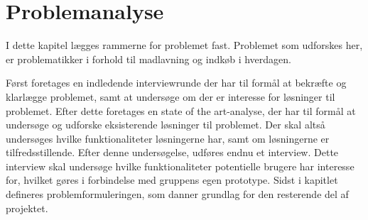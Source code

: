 \chapter{Problemanalyse}\label{chapter:problemanalyse}
I dette kapitel lægges rammerne for problemet fast.
Problemet som udforskes her, er problematikker i forhold til madlavning og indkøb i hverdagen. 

Først foretages en indledende interviewrunde der har til formål at bekræfte og klarlægge problemet, samt at undersøge om der er interesse for løsninger til problemet.
Efter dette foretages en state of the art-analyse, der har til formål at undersøge og udforske eksisterende løsninger til problemet.
Der skal altså undersøges hvilke funktionaliteter løsningerne har, samt om løsningerne er tilfredsstillende.
Efter denne undersøgelse, udføres endnu et interview.
Dette interview skal undersøge hvilke funktionaliteter potentielle brugere har interesse for, hvilket gøres i forbindelse med gruppens egen prototype.
Sidst i kapitlet defineres problemformuleringen, som danner grundlag for den resterende del af projektet.





